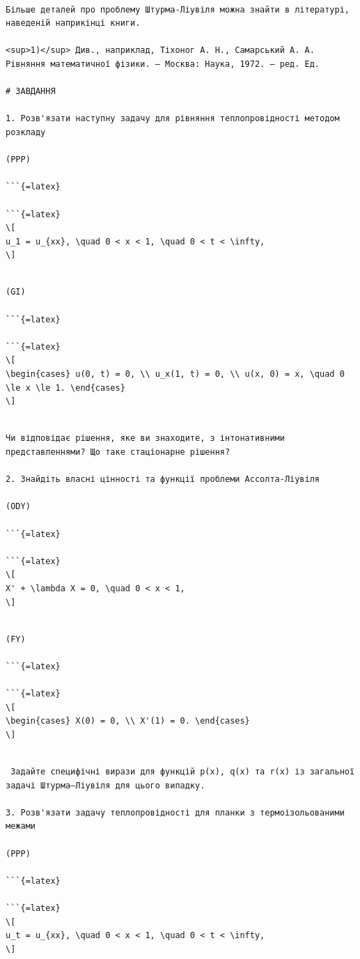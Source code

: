 \documentclass[
  ukrainian,
]{article}
\begin{document}
\begin{verbatim}

Більше деталей про проблему Штурма-Ліувіля можна знайти в літературі, наведеній наприкінці книги.

<sup>1)</sup> Див., наприклад, Тіхоног А. Н., Самарський А. А. Рівняння математичної фізики. — Москва: Наука, 1972. — ред. Ед.

# ЗАВДАННЯ

1. Розв'язати наступну задачу для рівняння теплопровідності методом розкладу

(PPP)

```{=latex}

```{=latex}
\[
u_1 = u_{xx}, \quad 0 < x < 1, \quad 0 < t < \infty,
\]
\end{verbatim}

\begin{verbatim}

(GI)

```{=latex}

```{=latex}
\[
\begin{cases} u(0, t) = 0, \\ u_x(1, t) = 0, \\ u(x, 0) = x, \quad 0 \le x \le 1. \end{cases}
\]
\end{verbatim}

\begin{verbatim}

Чи відповідає рішення, яке ви знаходите, з інтонативними представленнями? Що таке стаціонарне рішення?

2. Знайдіть власні цінності та функції проблеми Ассолта-Ліувіля

(ODY)

```{=latex}

```{=latex}
\[
X' + \lambda X = 0, \quad 0 < x < 1,
\]
\end{verbatim}

\begin{verbatim}

(FY) 

```{=latex}

```{=latex}
\[
\begin{cases} X(0) = 0, \\ X'(1) = 0. \end{cases}
\]
\end{verbatim}

\begin{verbatim}

 Задайте специфічні вирази для функцій p(x), q(x) та r(x) із загальної задачі Штурма–Ліувіля для цього випадку.

3. Розв'язати задачу теплопровідності для планки з термоізольованими межами

(PPP)

```{=latex}

```{=latex}
\[
u_t = u_{xx}, \quad 0 < x < 1, \quad 0 < t < \infty,
\]
\end{verbatim}
\end{document}
